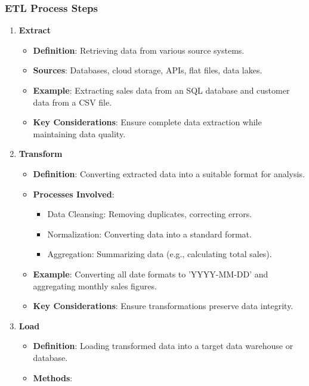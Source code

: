 \documentclass[aspectratio=169]{beamer}
\begin{document}
\begin{frame}[fragile]
    \frametitle{ETL Process Steps}
    \begin{enumerate}
        \item \textbf{Extract}
            \begin{itemize}
                \item \textbf{Definition}: Retrieving data from various source systems.
                \item \textbf{Sources}: Databases, cloud storage, APIs, flat files, data lakes.
                \item \textbf{Example}: Extracting sales data from an SQL database and customer data from a CSV file.
                \item \textbf{Key Considerations}: Ensure complete data extraction while maintaining data quality.
            \end{itemize}
        \item \textbf{Transform}
            \begin{itemize}
                \item \textbf{Definition}: Converting extracted data into a suitable format for analysis.
                \item \textbf{Processes Involved}:
                    \begin{itemize}
                        \item Data Cleansing: Removing duplicates, correcting errors.
                        \item Normalization: Converting data into a standard format.
                        \item Aggregation: Summarizing data (e.g., calculating total sales).
                    \end{itemize}
                \item \textbf{Example}: Converting all date formats to 'YYYY-MM-DD' and aggregating monthly sales figures.
                \item \textbf{Key Considerations}: Ensure transformations preserve data integrity.
            \end{itemize}
        \item \textbf{Load}
            \begin{itemize}
                \item \textbf{Definition}: Loading transformed data into a target data warehouse or database.
                \item \textbf{Methods}:
                    \begin{itemize}

\end{itemize}
\end{itemize}
\end{enumerate}
\end{frame}
\end{document}
